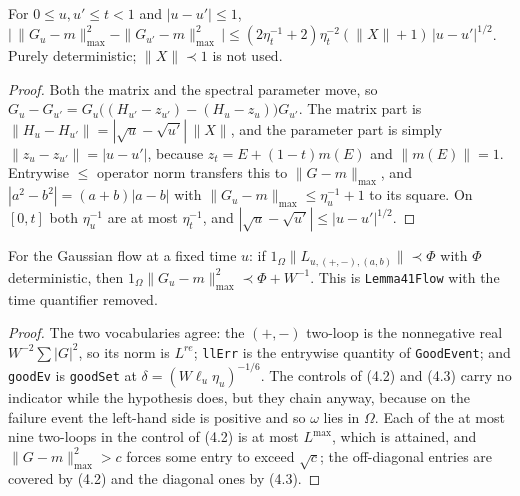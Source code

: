 \begin{lemma}\label{lem:flow-holder}
  \leanok{}
  For $0\le u,u'\le t<1$ and $|u-u'|\le1$,
  $\bigl|\,\|G_u-m\|_{\max}^2-\|G_{u'}-m\|_{\max}^2\,\bigr|
  \le(2\eta_t^{-1}+2)\eta_t^{-2}(\|X\|+1)\,|u-u'|^{1/2}$.
  Purely deterministic; $\|X\|\prec1$ is not used.
\end{lemma}
\begin{proof}\leanok
  Both the matrix and the spectral parameter move, so
  $G_u-G_{u'}=G_u\bigl((H_{u'}-z_{u'})-(H_u-z_u)\bigr)G_{u'}$.  The matrix part is
  $\|H_u-H_{u'}\|=|\sqrt u-\sqrt{u'}|\,\|X\|$, and the parameter part is simply
  $\|z_u-z_{u'}\|=|u-u'|$, because $z_t=E+(1-t)m(E)$ and $\|m(E)\|=1$.  Entrywise
  $\le$ operator norm transfers this to $\|G-m\|_{\max}$, and
  $|a^2-b^2|=(a+b)|a-b|$ with $\|G_u-m\|_{\max}\le\eta_u^{-1}+1$ to its square.  On $[0,t]$
  both $\eta_u^{-1}$ are at most $\eta_t^{-1}$, and
  $|\sqrt u-\sqrt{u'}|\le|u-u'|^{1/2}$.
\end{proof}

\begin{lemma}\label{lem:4.1-fixedtime}
  \leanok{}
  For the Gaussian flow at a fixed time $u$: if $1_\Omega\|L_{u,(+,-),(a,b)}\|\prec\Phi$ with
  $\Phi$ deterministic, then $1_\Omega\|G_u-m\|_{\max}^2\prec\Phi+W^{-1}$.  This is
  \texttt{Lemma41Flow} with the time quantifier removed.
\end{lemma}
\begin{proof}\leanok
  The two vocabularies agree: the $(+,-)$ two-loop is the nonnegative real
  $W^{-2}\sum|G|^2$, so its norm is $L^{re}$; \texttt{llErr} is the entrywise quantity of
  \texttt{GoodEvent}; and \texttt{goodEv} is \texttt{goodSet} at $\delta=(W\ell_u\eta_u)^{-1/6}$.
  The controls of (4.2) and (4.3) carry no indicator while the hypothesis does, but they chain
  anyway, because on the failure event the left-hand side is positive and so $\omega$ lies in
  $\Omega$.  Each of the at most nine two-loops in the control of (4.2) is at most $L^{\max}$,
  which is attained, and $\|G-m\|_{\max}^2>c$ forces some entry to exceed $\sqrt c$; the
  off-diagonal entries are covered by (4.2) and the diagonal ones by (4.3).
\end{proof}

